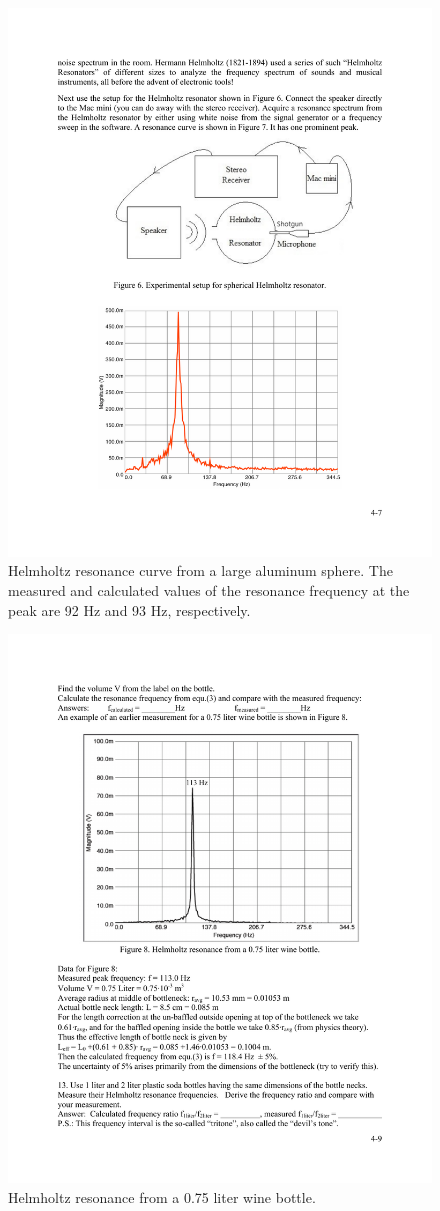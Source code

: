 \documentclass[11pt]{NSF}
\begin{document}
%
\begin{figure}[hbtp]
\begin{center}
\includegraphics[width=.7\textwidth]{fig4_7}
\caption{Helmholtz resonance curve from a large aluminum sphere. The measured
and calculated values of the resonance frequency at the peak are 92 Hz and 93
Hz, respectively.}
\label{f:7} 
\end{center} 
\end{figure}
%
%
\begin{figure}[hbtp]
\begin{center}
\includegraphics[width=.7\textwidth]{fig4_8}
\caption{Helmholtz resonance from a 0.75 liter wine bottle.}
\label{f:8} 
\end{center} 
\end{figure}
%
\end{document}
